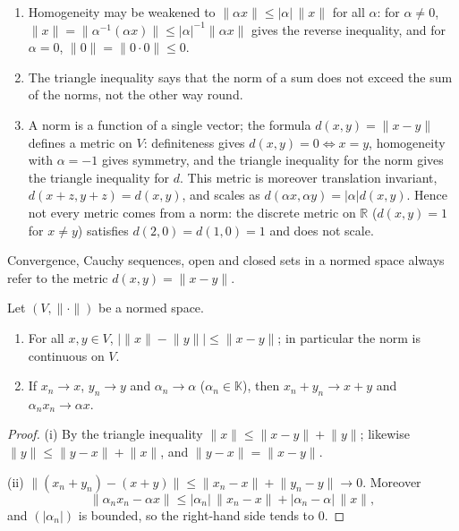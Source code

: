 \documentclass[11pt]{article}
\newcommand{\K}{\mathbb{K}}
\newcommand{\R}{\mathbb{R}}
\newcommand{\norm}[1]{\lVert #1\rVert}
\begin{document}
\begin{remark}
\begin{enumerate}
\item Homogeneity may be weakened to $\norm{\alpha x}\le|\alpha|\,\norm{x}$ for all $\alpha$: for $\alpha\ne0$, $\norm{x}=\norm{\alpha^{-1}(\alpha x)}\le|\alpha|^{-1}\norm{\alpha x}$ gives the reverse inequality, and for $\alpha=0$, $\norm{0}=\norm{0\cdot 0}\le 0$.
\item The triangle inequality says that the norm of a sum does not exceed the sum of the norms, not the other way round.
\item A norm is a function of a single vector; the formula $d(x,y)=\norm{x-y}$ defines a metric on $V$: definiteness gives $d(x,y)=0\Leftrightarrow x=y$, homogeneity with $\alpha=-1$ gives symmetry, and the triangle inequality for the norm gives the triangle inequality for $d$. This metric is moreover translation invariant, $d(x+z,y+z)=d(x,y)$, and scales as $d(\alpha x,\alpha y)=|\alpha|d(x,y)$. Hence not every metric comes from a norm: the discrete metric on $\R$ ($d(x,y)=1$ for $x\ne y$) satisfies $d(2,0)=d(1,0)=1$ and does not scale.
\end{enumerate}
\end{remark}

Convergence, Cauchy sequences, open and closed sets in a normed space always refer to the metric $d(x,y)=\norm{x-y}$.

\begin{proposition}\label{prop:norm-cont}
Let $(V,\norm{\cdot})$ be a normed space.
\begin{enumerate}
\item For all $x,y\in V$, $\bigl|\norm{x}-\norm{y}\bigr|\le\norm{x-y}$; in particular the norm is continuous on $V$.
\item If $x_{n}\to x$, $y_{n}\to y$ and $\alpha_{n}\to\alpha$ ($\alpha_n\in\K$), then $x_{n}+y_{n}\to x+y$ and $\alpha_{n}x_{n}\to\alpha x$.
\end{enumerate}
\end{proposition}

\begin{proof}
(i) By the triangle inequality $\norm{x}\le\norm{x-y}+\norm{y}$; likewise $\norm{y}\le\norm{y-x}+\norm{x}$, and $\norm{y-x}=\norm{x-y}$.

(ii) $\norm{(x_{n}+y_{n})-(x+y)}\le\norm{x_{n}-x}+\norm{y_{n}-y}\to0$. Moreover
\[
\norm{\alpha_{n}x_{n}-\alpha x}\le|\alpha_{n}|\,\norm{x_{n}-x}+|\alpha_{n}-\alpha|\,\norm{x},
\]
and $(|\alpha_{n}|)$ is bounded, so the right-hand side tends to $0$.
\end{proof}
\end{document}
